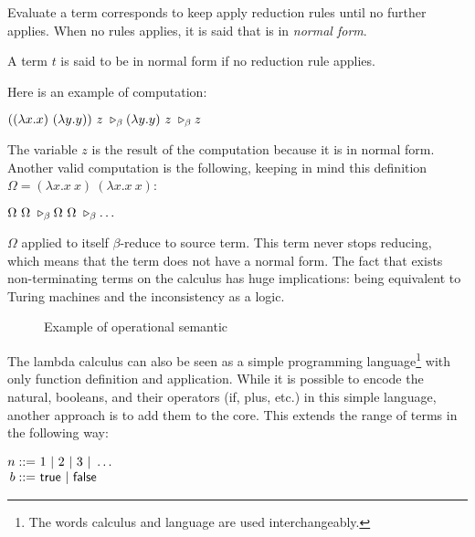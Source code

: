 Evaluate a term corresponds to keep apply reduction rules until no further applies. When no rules 
applies, it is said that is in \emph{normal form}.
\begin{Definition}
A term $t$ is said to be in normal form if no reduction rule applies.
\end{Definition}
\noindent Here is an example of computation:
\begin{center}
    $((\lambda x. x)\ (\lambda y. y))\ z \ \triangleright_{\beta}(\lambda y. y)\ z \ \triangleright_{\beta}z$
\end{center}
The variable $z$ is the result of the computation because it is in normal form. Another valid 
computation is the following, keeping in mind this definition $\Omega=(\lambda x.x\ x)\ (\lambda x.x\ x)$:
\begin{center}
$\Omega\ \Omega \reductionBeta{} \Omega\ \Omega \reductionBeta{} \dots $
\end{center}
$\Omega$ applied to itself $\beta$-reduce to source term. 
This term never stops reducing, which means that the term does not have 
a normal form. The fact that exists non-terminating terms on the calculus has huge implications: being equivalent
to Turing machines and the inconsistency as a logic.
\begin{figure}
    \centering
    \caption{Example of operational semantic}
    \label{fig:ExOpSem}
\end{figure}
\vspace{1em}

The lambda calculus can also be seen as a simple programming language\footnote{The words calculus and language are 
used interchangeably.} with only function definition and application.  
While it is possible to encode the natural, booleans, and their operators (if, plus, etc.) in this simple
language, another approach is to add them to the core. This extends the range of terms in the 
following way:
\begin{center}
$
    \begin{array}{@{ }r@{ }c@{}l}
    n &{}::=&\ 1\ |\ 2\ |\ 3\ |\ \dots\\
    b &{}::=&\ \trueTerm\ |\ \falseTerm
    \end{array}
$
\end{center}


